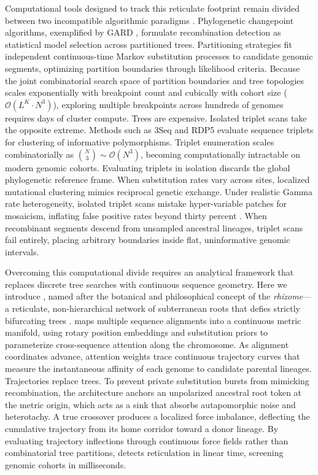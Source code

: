 Computational tools designed to track this reticulate footprint remain divided between two incompatible algorithmic paradigms \citep{posada2002evaluation,martin2015rdp4}.
Phylogenetic changepoint algorithms, exemplified by GARD \citep{kosakovsky2006gard}, formulate recombination detection as statistical model selection across partitioned trees.
Partitioning strategies fit independent continuous-time Markov substitution processes to candidate genomic segments, optimizing partition boundaries through likelihood criteria.
Because the joint combinatorial search space of partition boundaries and tree topologies scales exponentially with breakpoint count and cubically with cohort size ($\mathcal{O}(L^K \cdot N^3)$), exploring multiple breakpoints across hundreds of genomes requires days of cluster compute.
Trees are expensive.
Isolated triplet scans take the opposite extreme.
Methods such as 3Seq \citep{lam20183seq} and RDP5 \citep{martin2021rdp5} evaluate sequence triplets for clustering of informative polymorphisms.
Triplet enumeration scales combinatorially as $\binom{N}{3} \sim \mathcal{O}(N^3)$, becoming computationally intractable on modern genomic cohorts.
Evaluating triplets in isolation discards the global phylogenetic reference frame.
When substitution rates vary across sites, localized mutational clustering mimics reciprocal genetic exchange.
Under realistic Gamma rate heterogeneity, isolated triplet scans mistake hyper-variable patches for mosaicism, inflating false positive rates beyond thirty percent \citep{posada2001evaluation,kosakovsky2006gard}.
When recombinant segments descend from unsampled ancestral lineages, triplet scans fail entirely, placing arbitrary boundaries inside flat, uninformative genomic intervals.

Overcoming this computational divide requires an analytical framework that replaces discrete tree searches with continuous sequence geometry.
Here we introduce \RhizAeon, named after the botanical and philosophical concept of the \emph{rhizome}---a reticulate, non-hierarchical network of subterranean roots that defies strictly bifurcating trees \citep{deleuze1987thousand}.
\RhizAeon maps multiple sequence alignments into a continuous metric manifold, using rotary position embeddings and substitution priors to parameterize cross-sequence attention along the chromosome.
As alignment coordinates advance, attention weights trace continuous trajectory curves that measure the instantaneous affinity of each genome to candidate parental lineages.
Trajectories replace trees.
To prevent private substitution bursts from mimicking recombination, the architecture anchors an unpolarized ancestral root token at the metric origin, which acts as a sink that absorbs autapomorphic noise and heterotachy.
A true crossover produces a localized force imbalance, deflecting the cumulative trajectory from its home corridor toward a donor lineage.
By evaluating trajectory inflections through continuous force fields rather than combinatorial tree partitions, \RhizAeon detects reticulation in linear time, screening genomic cohorts in milliseconds.

